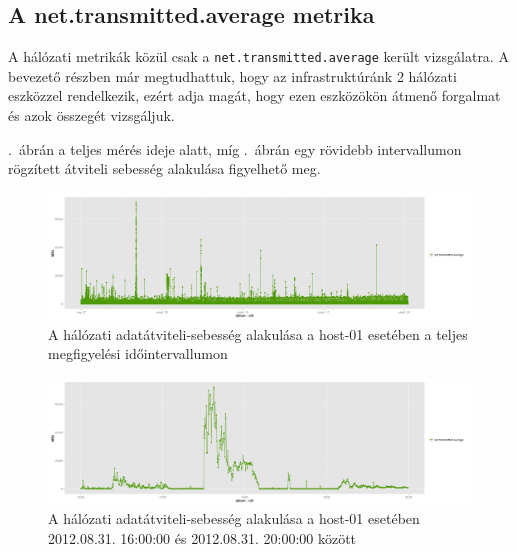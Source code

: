\documentclass[a4paper,10pt,titlepage]{article}
\begin{document}
\subsection{A net.transmitted.average metrika}

A hálózati metrikák közül csak a \texttt{net.transmitted.average} került vizsgálatra. A bevezető részben már megtudhattuk, hogy az infrastruktúránk 2 hálózati eszközzel rendelkezik, ezért adja magát, hogy ezen eszközökön átmenő forgalmat és azok összegét vizsgáljuk.

.~ábrán a teljes mérés ideje alatt, míg .~ábrán egy rövidebb intervallumon rögzített átviteli sebesség alakulása figyelhető meg.

\begin{figure}[ht!]
\centering
\includegraphics[width=1.00\textwidth]{figures/net_transmitted_average-20120826230140-20120924083120.png}
\caption{ A hálózati adatátviteli-sebesség alakulása a host-01 esetében a teljes megfigyelési időintervallumon \label{fig:net_transmitted_average-01}}
\end{figure}

\begin{figure}[ht!]
\centering
\includegraphics[width=1.00\textwidth]{figures/net_transmitted_average-20120831160000-20120831200000.png}
\caption{ A hálózati adatátviteli-sebesség alakulása a host-01 esetében 2012.08.31. 16:00:00 és 2012.08.31. 20:00:00 között \label{fig:net_transmitted_average-02}}
\end{figure}
\end{document}
